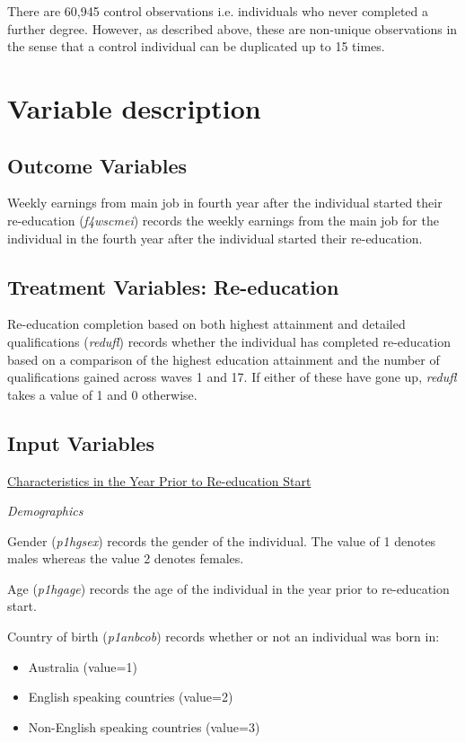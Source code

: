 \documentclass[12pt, a4paper]{article}
\begin{document}
There are 60,945 control observations i.e. individuals who never completed a further degree. However, as described above, these are non-unique observations in the sense that a control individual can be duplicated up to 15 times. 


\appendix

\section{Variable description}

\subsection{Outcome Variables}
Weekly earnings from main job in fourth year after the individual started their re-education (\textit{f4\textunderscore{}wscmei}) records the weekly earnings from the main job for the individual in the fourth year after the individual started their re-education. 

\subsection{Treatment Variables: Re-education}
Re-education completion based on both highest attainment and detailed qualifications (\textit{redufl}) records whether the individual has completed re-education based on a comparison of the highest education attainment and the number of qualifications gained across waves 1 and 17. If either of these have gone up, \textit{redufl} takes a value of 1 and 0 otherwise. 

\subsection{Input Variables}

\underline{Characteristics in the Year Prior to Re-education Start}

\emph{Demographics}

Gender (\textit{p1\textunderscore{}hgsex}) records the gender of the individual. The value of 1 denotes males whereas the value 2 denotes females. 

Age (\textit{p1\textunderscore{}hgage}) records the age of the individual in the year prior to re-education start.
 
Country of birth (\textit{p1\textunderscore{}anbcob}) records whether or not an individual was born in:
\begin{itemize}
  \item Australia (value=1) 
  \item English speaking countries (value=2)
  \item Non-English speaking countries (value=3)
\end{itemize}  
\end{document}
